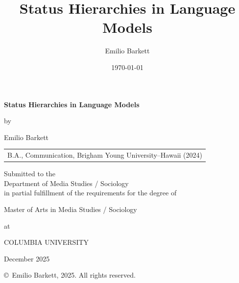 \documentclass[10pt]{article}
\title{Status Hierarchies in Language Models}
\author{Emilio Barkett}
\date{\today}
\begin{document}
\thispagestyle{empty}
\begin{center}
\vspace*{0.5in}
{\Large\bfseries Status Hierarchies in Language Models}
\vspace{0.4in}

by

\vspace{0.2in}
Emilio Barkett

\vspace{0.3in}
\begin{tabular}{c}
B.A., Communication, Brigham Young University--Hawaii (2024)\\
\end{tabular}

\vspace{0.5in}
Submitted to the\\
Department of Media Studies / Sociology\\
in partial fulfillment of the requirements for the degree of

\vspace{0.2in}
Master of Arts in Media Studies / Sociology

\vspace{0.2in}
at

\vspace{0.2in}
COLUMBIA UNIVERSITY

\vspace{0.3in}
December 2025

\vspace{0.3in}
\copyright\ Emilio Barkett, 2025. All rights reserved.

\vspace{1in}
\end{center}

\newpage

\maketitle
\begingroup
\renewcommand{\thefootnote}{\dag}
\endgroup
\end{document}
